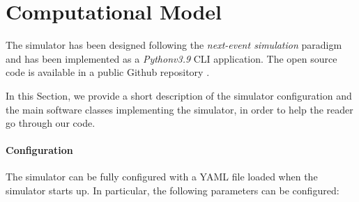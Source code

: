 \section{Computational Model}
\label{sec:performance-modeling-computational-model}
The simulator has been designed following the \textit{next-event simulation} paradigm \cite{leemis2006discrete} and has been implemented as a \textit{Pythonv3.9} CLI application. 
The open source code is available in a public Github repository \cite{gmarciani-pydes}.

In this Section, we provide a short description of the simulator configuration and the main software classes implementing the simulator, in order to help the reader go through our code.

\paragraph{Configuration}
The simulator can be fully configured with a YAML file loaded when the simulator starts up. 
In particular, the following parameters can be configured:

